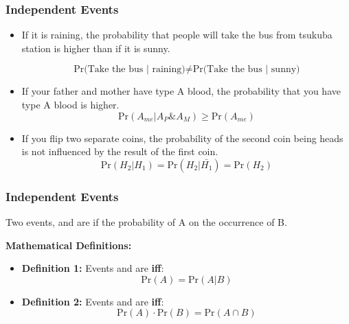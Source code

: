 \documentclass{beamer}
\begin{document}
\begin{frame}
  \frametitle{Independent Events}

  \begin{itemize}
  \item If it is raining, the probability that people will take the
    bus from tsukuba station is higher than if it is sunny.

    \begin{equation*}
      \text{Pr(Take the bus | raining)} \neq \text{Pr(Take the bus | sunny)}
    \end{equation*}
    \bigskip

  \item If your father and mother have type A blood, the probability
    that you have type A blood is higher.
    \begin{equation*}
      \text{Pr}(A_{me} | A_{P} \& A_{M}) \geq \text{Pr}(A_{me})
    \end{equation*}
    \bigskip
    
  \item If you flip two separate coins, the probability of the second
    coin being heads is not influenced by the result of the first
    coin.
    \begin{equation*}
      \text{Pr}(H_2 | H_1) = \text{Pr}(H_2 | \bar{H_1}) = \text{Pr}(H_2)
    \end{equation*}
  \end{itemize} 
\end{frame}

\begin{frame}
  \frametitle{Independent Events}

  Two events,  and  are  if the
  probability of A  on the occurrence of B.

  \bigskip

  {\bf Mathematical Definitions:}
  \begin{itemize}
  \item {\bf Definition 1:} Events  and  are
     {\bf iff}:
    \begin{equation}
      \text{Pr}(A) = \text{Pr}(A|B)
    \end{equation}
  \item {\bf Definition 2:} Events  and  are
     {\bf iff}:
    \begin{equation}
      \text{Pr}(A)\cdot\text{Pr}(B) = \text{Pr}(A\cap B)
    \end{equation}
  \end{itemize}
\end{frame}
\end{document}

